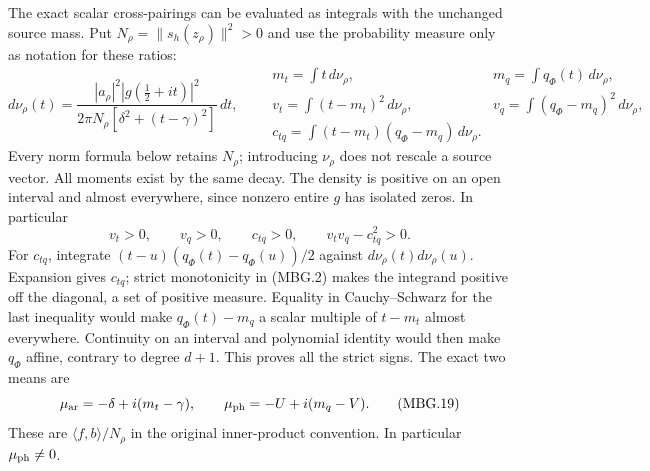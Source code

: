The exact scalar cross-pairings can be evaluated as integrals with the
unchanged source mass. Put \(N_\rho=\|s_h(z_\rho)\|^2>0\) and use the
probability measure only as notation for these ratios:
\[
 d\nu_\rho(t)=
 \frac{|a_\rho|^2|g(\tfrac12+it)|^2}
 {2\pi N_\rho[\delta^2+(t-\gamma)^2]}\,dt,\qquad
 \begin{array}{ll}
 m_t=\int t\,d\nu_\rho,&m_q=\int q_\Phi(t)\,d\nu_\rho,\\
 v_t=\int(t-m_t)^2\,d\nu_\rho,&
 v_q=\int(q_\Phi-m_q)^2\,d\nu_\rho,\\
 c_{tq}=\int(t-m_t)(q_\Phi-m_q)\,d\nu_\rho .
 \end{array}
 \tag{MBG.17}\label{eq:mbg-terminal-moments}
\]
Every norm formula below retains \(N_\rho\); introducing \(\nu_\rho\)
does not rescale a source vector. All moments exist by the same decay.
The density is positive on an open interval and almost everywhere,
since nonzero entire \(g\) has isolated zeros. In particular
\[
 v_t>0,\qquad v_q>0,\qquad c_{tq}>0,\qquad
 v_tv_q-c_{tq}^2>0.
 \tag{MBG.18}\label{eq:mbg-strict-covariance}
\]
For \(c_{tq}\), integrate
\((t-u)(q_\Phi(t)-q_\Phi(u))/2\) against
\(d\nu_\rho(t)d\nu_\rho(u)\). Expansion gives \(c_{tq}\);
strict monotonicity in (MBG.2) makes the integrand positive off the
diagonal, a set of positive measure. Equality in Cauchy--Schwarz for
the last inequality would make \(q_\Phi(t)-m_q\) a scalar multiple of
\(t-m_t\) almost everywhere. Continuity on an interval and polynomial
identity would then make \(q_\Phi\) affine, contrary to degree \(d+1\).
This proves all the strict signs.
The exact two means are
\[
 \mu_{\rm ar}=-\delta+i(m_t-\gamma),\qquad
 \mu_{\rm ph}=-U+i(m_q-V).
 \tag{MBG.19}\label{eq:mbg-means}
\]
These are \(\langle f,b\rangle/N_\rho\) in the original inner-product
convention. In particular \(\mu_{\rm ph}\ne0\).

